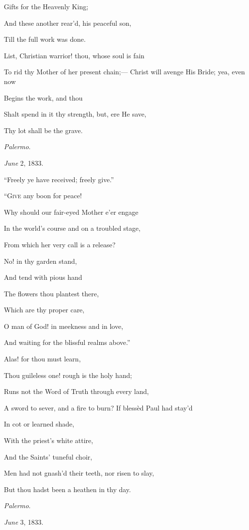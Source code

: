 Gifts for the Heavenly
King;

And these another rear'd, his peaceful son,

Till the full work was
done.

List, Christian warrior! thou, whose soul is fain

To rid thy Mother of her present chain;— Christ will avenge His Bride; yea, even now

Begins the work, and thou

Shalt spend in it thy strength, but, ere He save,

Thy lot shall be the
grave.

\emph{Palermo}.

\emph{June} 2, 1833.


``Freely ye have received; freely
give.''

``G\textsc{ive} any boon for peace!

Why should our fair-eyed Mother e'er engage

In the world's course and on a troubled stage,

From which her very call is a release?

No! in
thy garden stand,

And
tend with pious hand

The
flowers thou plantest there,

Which
are thy proper care,

O man of God! in meekness and in love,

And waiting for the blissful realms above.''

Alas! for
thou must learn,

Thou guileless one! rough is the holy hand;

Runs not the Word of Truth through every land,

A sword to sever, and a fire to burn? If
blessèd Paul had stay'd

In cot
or learned shade,

With
the priest's white attire,

And the
Saints' tuneful choir,

Men had not gnash'd their teeth, nor risen to slay,

But
thou hadst been a heathen in thy day.

\emph{Palermo}.

\emph{June} 3, 1833.



